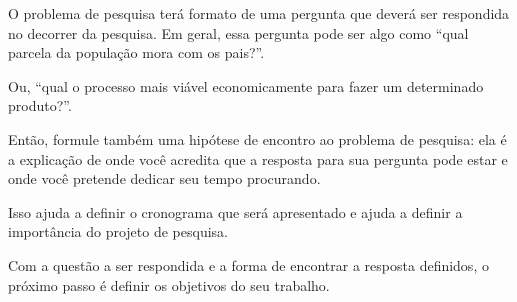 O problema de pesquisa terá formato de uma pergunta que deverá ser respondida no decorrer da pesquisa. Em geral, essa pergunta pode ser algo como “qual parcela da população mora com os pais?”.

Ou, “qual o processo mais viável economicamente para fazer um determinado produto?”.

Então, formule também uma hipótese de encontro ao problema de pesquisa: ela é a explicação de onde você acredita que a resposta para sua pergunta pode estar e onde você pretende dedicar seu tempo procurando.

Isso ajuda a definir o cronograma que será apresentado e ajuda a definir a importância do projeto de pesquisa.

Com a questão a ser respondida e a forma de encontrar a resposta definidos, o próximo passo é definir os objetivos do seu trabalho.
